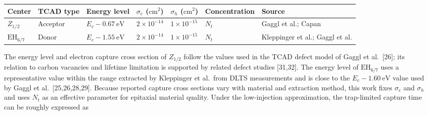 \documentclass[
  10pt,
  a4paper,
]{article}
\newcounter{none} %
\begin{document}
{\def\LTcaptype{none} %
\begin{longtable}[]{@{}
  >{\centering\arraybackslash}p{}
  >{\centering\arraybackslash}p{}
  >{\centering\arraybackslash}p{}
  >{\centering\arraybackslash}p{}
  >{\centering\arraybackslash}p{}
  >{\centering\arraybackslash}p{}
  >{\centering\arraybackslash}p{}@{}}
\toprule\noalign{}
\begin{minipage}[b]{\linewidth}\centering
Center
\end{minipage} & \begin{minipage}[b]{\linewidth}\centering
TCAD type
\end{minipage} & \begin{minipage}[b]{\linewidth}\centering
Energy level
\end{minipage} & \begin{minipage}[b]{\linewidth}\centering
\(\sigma_e\) (\(\mathrm{cm^2}\))
\end{minipage} & \begin{minipage}[b]{\linewidth}\centering
\(\sigma_h\) (\(\mathrm{cm^2}\))
\end{minipage} & \begin{minipage}[b]{\linewidth}\centering
Concentration
\end{minipage} & \begin{minipage}[b]{\linewidth}\centering
Source
\end{minipage} \\
\midrule\noalign{}
\endhead
\bottomrule\noalign{}
\endlastfoot
\(Z_{1/2}\) & Acceptor & \(E_c-0.67\ \mathrm{eV}\) & \(2\times10^{-14}\)
& \(1\times10^{-15}\) & \(N_t\) & Gaggl et al.; Capan \\
\(\mathrm{EH}_{6/7}\) & Donor & \(E_c-1.55\ \mathrm{eV}\) &
\(2\times10^{-14}\) & \(1\times10^{-15}\) & \(N_t\) & Kleppinger et al.;
Gaggl et al. \\
\end{longtable}
}

The energy level and electron capture cross section of \(Z_{1/2}\)
follow the values used in the TCAD defect model of Gaggl et
al.~{[}26{]}; its relation to carbon vacancies and lifetime limitation
is supported by related defect studies {[}31,32{]}. The energy level of
\(\mathrm{EH}_{6/7}\) uses a representative value within the range
extracted by Kleppinger et al.~from DLTS measurements and is close to
the \(E_c-1.60\ \mathrm{eV}\) value used by Gaggl et
al.~{[}25,26,28,29{]}. Because reported capture cross sections vary with
material and extraction method, this work fixes \(\sigma_e\) and
\(\sigma_h\) and uses \(N_t\) as an effective parameter for epitaxial
material quality. Under the low-injection approximation, the
trap-limited capture time can be roughly expressed as
\end{document}
